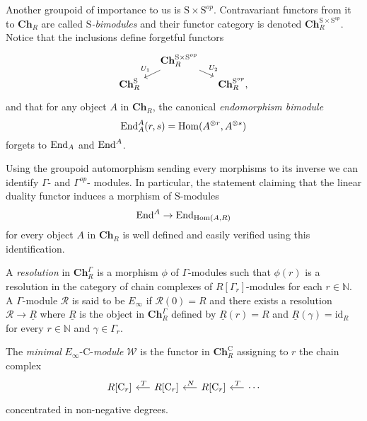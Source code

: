 Another groupoid of importance to us is $\mathrm{S} \times \mathrm{S}^{op}$. Contravariant functors from it to $\mathbf{Ch}_R$ are called \textit{$\mathrm{S}$-bimodules} and their functor category is denoted $\mathbf{Ch}_R^{\mathrm{S} \times \mathrm{S}^{op}}$. Notice that the inclusions
define forgetful functors
\begin{equation*}
\begin{tikzcd}[column sep=small, row sep=tiny]
& \mathbf{Ch}_R^{\mathrm{S} \times \mathrm{S}^{op}} \arrow[dl, "U_1"'] \arrow[dr, "U_2"] & \\
\mathbf{Ch}_R^{\mathrm{S}} &  & \mathbf{Ch}_R^{\mathrm{S}^{op}},
\end{tikzcd}
\end{equation*}
and that for any object $A$ in $\mathbf{Ch}_R$, the canonical \textit{endomorphism bimodule}
\begin{equation*}
\mathrm{End}_A^A(r, s) = \mathrm{Hom}(A^{\otimes r}, A^{\otimes s})
\end{equation*}
forgets to $\mathrm{End}_A$ and $\mathrm{End}^A$.

Using the groupoid automorphism sending every morphisms to its inverse we can identify $\Gamma$- and $\Gamma^{op}$- modules. In particular, the statement claiming that the linear duality functor induces a morphism of $\mathrm{S}$-modules
\begin{equation*}
\mathrm{End}^A \to \mathrm{End}_{\mathrm{Hom}(A, R)}
\end{equation*}
for every object $A$ in $\mathbf{Ch}_R$ is well defined and easily verified using this identification.

A \textit{resolution} in $\mathbf{Ch}_R^\Gamma$ is a morphism $\phi$ of $\Gamma$-modules such that $\phi(r)$ is a resolution in the category of chain complexes of $R[\Gamma_r]$-modules for each $r \in \mathbb{N}$. A $\Gamma$-module $\mathcal R$ is said to be $E_\infty$ if $\mathcal R(0) = R$ and there exists a resolution $\mathcal R \to \underline{R}$ where $\underline{R}$ is the object in $\mathbf{Ch}_R^\Gamma$ defined by $\underline{R}(r) = R$ and $\underline{R}(\gamma) = \mathrm{id}_R$ for every $r \in \mathbb{N}$ and $\gamma \in \Gamma_r$.

\begin{definition} \label{def: minimal cyclic resolution}
	The \textit{minimal} $E_\infty$-$\mathrm{C}$-\textit{module} $\mathcal W$ is the functor in $\mathbf{Ch}_R^\mathrm{C}$ assigning to $r$ the chain complex
	\begin{equation*}
	\begin{tikzcd} [column sep = .5cm]
	R[\mathrm{C}_r] & \arrow[l, "\,T"'] R[\mathrm{C}_r] & \arrow[l, "\,N"'] R[\mathrm{C}_r] & \arrow[l, "\,T"'] \cdots
	\end{tikzcd}
	\end{equation*}
	concentrated in non-negative degrees.
\end{definition}


